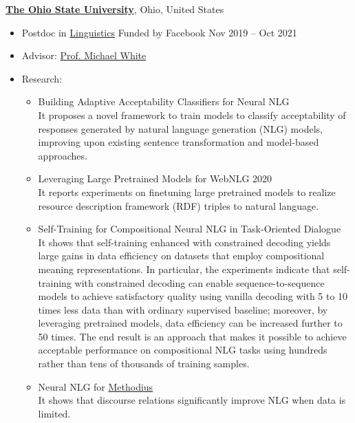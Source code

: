 \vspace{16pt}
{\bf \href{https://www.osu.edu/}{The Ohio State University}}, Ohio, United States
\begin{itemize}
    \item[] Postdoc in \href{https://linguistics.osu.edu/}{Linguistics} Funded by Facebook \hfill Nov 2019 -- Oct 2021
    \item[] Advisor: \href{https://u.osu.edu/white.1240/}{Prof. Michael White}
    \item[] Research:
    \begin{itemize}
        \item Building Adaptive Acceptability Classifiers for Neural NLG~\cite{batra-etal-2021-building} \\
        It proposes a novel framework to train models to classify acceptability of responses generated by natural language generation (NLG) models, improving upon existing sentence transformation and model-based approaches.
        \item Leveraging Large Pretrained Models for {W}eb{NLG} 2020~\cite{li-etal-2020-leveraging-large} \\
        It reports experiments on finetuning large pretrained models to realize resource description framework (RDF) triples to natural language.
        \item Self-Training for Compositional Neural NLG in Task-Oriented Dialogue~\cite{li-white-wecnlp-2020, li-etal-2021-self} \\
        It shows that self-training enhanced with constrained decoding yields large gains in data efficiency on datasets that employ compositional meaning representations.
        In particular, the experiments indicate that self-training with constrained decoding can enable sequence-to-sequence models to achieve satisfactory quality using vanilla decoding with 5 to 10 times less data than with ordinary supervised baseline; moreover, by leveraging pretrained models, data efficiency can be increased further to 50 times.
        The end result is an approach that makes it possible to achieve acceptable performance on compositional NLG tasks using hundreds rather than tens of thousands of training samples.
        \item Neural NLG for \href{https://aclanthology.org/L16-1273/}{Methodius}~\cite{stevens-guille-etal-2020-neural, maskharashvili-etal-2021-neural} \\
        It shows that discourse relations significantly improve NLG when data is limited.
    \end{itemize}
\end{itemize}

